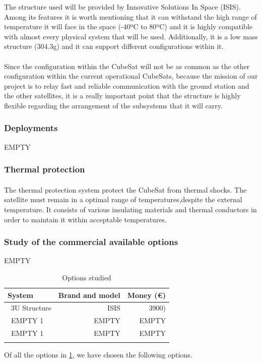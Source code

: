 The structure used will be provided by Innovative Solutions In Space (ISIS). Among its features it is worth mentioning that it can withstand the high range of temperature it will face in the space (-40ºC to 80ºC) and it is highly compatible with almost every physical system that will be used. Additionally, it is a low mass structure (304.3g) and it can support different configurations within it.

\paragraph{}Since the configuration within the CubeSat will not be as common as the other configuration within the current operational CubeSats, because the mission of our project is to relay fast and reliable communication with the ground station and the other satellites, it is a really important point that the structure is highly flexible regarding the arrangement of the subsystems that it will carry.

\subsubsection{Deployments}
EMPTY
\subsubsection{Thermal protection}
\paragraph{}The thermal protection system protect the CubeSat from thermal shocks. The satellite must remain in a optimal range of temperatures,despite the external temperature. It consists of various insulating materials and thermal conductors in order to maintain it within acceptable temperatures.

\subsubsection{Study of the commercial available options}
EMPTY

\begin{longtable}{| l | r | r | }
\hline
\rowcolor[gray]{0.80}	\textbf{System} &  \textbf{Brand and model}     & \textbf{Money (\euro)}   \\
\hline
\endfirsthead

	   ~3U Structure & ISIS & 3900) \\
	   ~EMPTY 1 & EMPTY & EMPTY \\
	   ~EMPTY 1 & EMPTY & EMPTY \\
	\hline

\caption{Options studied}
\label{epsoptionstable}
\end{longtable}

Of all the options in \ref{epsoptionstable}, we have chosen the following options.
